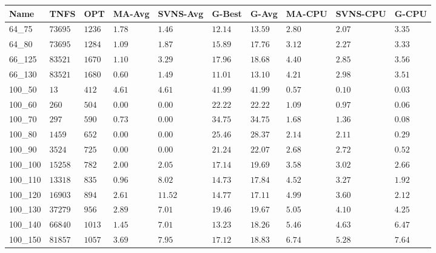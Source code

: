 \begin{center}
    \begin{table}[]
    \centering
    \begin{adjustwidth}{-0.4in}{-1in}
    \begin{tabular}{|lll|l|l|ll|lll|}
\hline
Name     & TNFS        & OPT    & MA-Avg & SVNS-Avg & G-Best & G-Avg & MA-CPU & SVNS-CPU & G-CPU \\
\hline
64\_75   & $73695   $  & $1236$ & $1.78$ & $1.46 $  & $12.14$    & $13.59$   & $2.80 $& $2.07$   & $3.35$ \\
64\_80   & $73695   $  & $1284$ & $1.09$ & $1.87 $  & $15.89$    & $17.76$   & $3.12 $& $2.27$   & $3.33$ \\
\hline
66\_125  & $83521   $  & $1670$ & $1.10$ & $3.29 $  & $17.96$    & $18.68$   & $4.40 $& $2.85$   & $3.56$ \\
66\_130  & $83521   $  & $1680$ & $0.60$ & $1.49 $  & $11.01$    & $13.10$   & $4.21 $& $2.98$   & $3.51$ \\
\hline
100\_50  & $13      $  & $412 $ & $4.61$ & $4.61 $  & $41.99$    & $41.99$   & $0.57 $& $0.10$   & $0.03$ \\
100\_60  & $260     $  & $504 $ & $\bm{0.00}$ & $\bm{0.00} $  & $22.22$    & $22.22$   & $1.09 $& $0.97$   & $0.06$ \\
100\_70  & $297     $  & $590 $ & $0.73$ & $\bm{0.00} $  & $34.75$    & $34.75$   & $1.68 $& $1.36$   & $0.08$ \\
100\_80  & $1459    $  & $652 $ & $\bm{0.00}$ & $\bm{0.00} $  & $25.46$    & $28.37$   & $2.14 $& $2.11$   & $0.29$ \\
100\_90  & $3524    $  & $725 $ & $\bm{0.00}$ & $\bm{0.00} $  & $21.24$    & $22.07$   & $2.68 $& $2.72$   & $0.52$ \\
100\_100 & $15258   $  & $782 $ & $2.00$ & $2.05 $  & $17.14$    & $19.69$   & $3.58 $& $3.02$   & $2.66$ \\
100\_110 & $13318   $  & $835 $ & $0.96$ & $8.02 $  & $14.73$    & $17.84$   & $4.52 $& $3.27$   & $1.92$ \\
100\_120 & $16903   $  & $894 $ & $2.61$ & $11.52$  & $14.77$    & $17.11$   & $4.99 $& $3.60$   & $2.12$ \\
100\_130 & $37279   $  & $956 $ & $2.89$ & $7.01 $  & $19.46$    & $19.67$   & $5.05 $& $4.10$   & $4.25$ \\
100\_140 & $66840   $  & $1013$ & $1.45$ & $7.01 $  & $13.23$    & $18.26$   & $5.46 $& $4.63$   & $6.47$ \\
100\_150 & $81857   $  & $1057$ & $3.69$ & $7.95 $  & $17.12$    & $18.83$   & $6.74 $& $5.28$   & $7.64$ \\

\end{tabular}
\end{adjustwidth}
\end{table}
\end{center}
